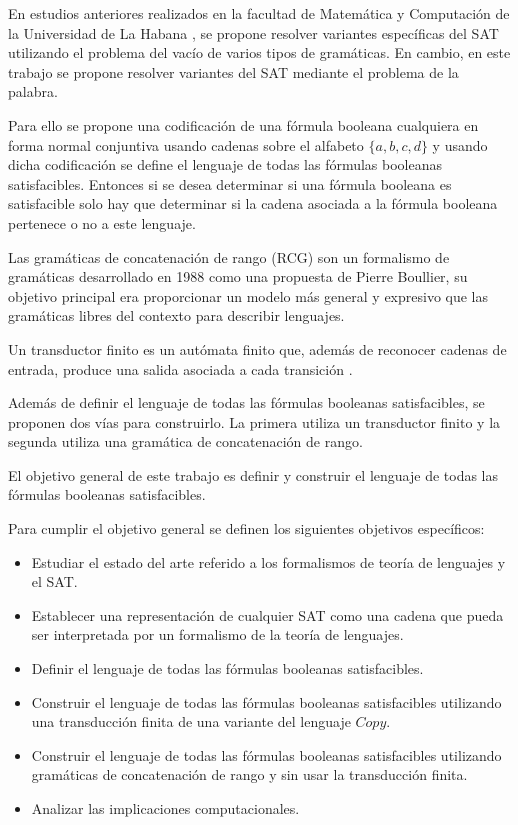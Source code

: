 \documentclass[12pt]{article}
\begin{document}
En estudios anteriores realizados en la facultad de Matemática y Computación de la Universidad de La Habana \cite{aCFSAT,aSRCSAT}, 
se propone resolver variantes específicas del SAT utilizando el problema del vacío de varios tipos de 
gramáticas. En cambio, en este trabajo se propone resolver variantes del SAT mediante el problema de la 
palabra. 

Para ello se propone una codificación de una fórmula booleana cualquiera en forma normal conjuntiva usando 
cadenas sobre el alfabeto $\{a,b,c,d\}$ y usando dicha codificación se define el lenguaje de todas las fórmulas 
booleanas satisfacibles. Entonces si se desea determinar si una fórmula booleana es satisfacible 
solo hay que determinar si la cadena asociada a la fórmula booleana pertenece o no a este lenguaje.

Las gramáticas de concatenación de rango (RCG) \cite{mainRCGBib} son un formalismo de
gramáticas desarrollado en 1988 como una propuesta de Pierre Boullier, su objetivo principal era
proporcionar un modelo más general y expresivo que las gramáticas libres del contexto para describir lenguajes.

Un transductor finito es un autómata finito que, además de reconocer cadenas de entrada, produce una salida asociada a cada transición \cite{finite_transducer}.

Además de definir el lenguaje de todas las fórmulas booleanas satisfacibles, se proponen dos vías para 
construirlo. La primera utiliza un transductor finito y la segunda utiliza una gramática de concatenación de rango.

El objetivo general de este trabajo es definir y construir el lenguaje de todas las fórmulas booleanas satisfacibles.

Para cumplir el objetivo general se definen los siguientes objetivos específicos:

\begin{itemize}
      \item Estudiar el estado del arte referido a los formalismos de teoría de lenguajes y el SAT.
      \item Establecer una representación de cualquier SAT como una cadena que pueda ser interpretada por un formalismo de la teoría de lenguajes.
      \item Definir el lenguaje de todas las fórmulas booleanas satisfacibles.
      \item Construir el lenguaje de todas las fórmulas booleanas satisfacibles utilizando una transducción finita de una variante del lenguaje $Copy$.
      \item Construir el lenguaje de todas las fórmulas booleanas satisfacibles  utilizando gramáticas de concatenación de rango y sin usar la transducción finita.
      \item Analizar las implicaciones computacionales.
\end{itemize}
\end{document}
